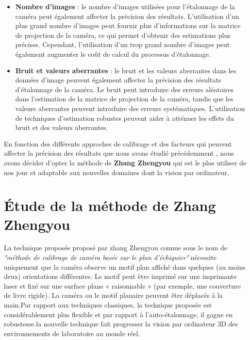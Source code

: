 \begin{itemize}
 	\item \textbf{Nombre d'images} :  le nombre d’images utilisées pour l’étalonnage de la caméra peut également affecter la précision des résultats. L’utilisation d’un plus grand nombre d’images peut fournir plus d’informations sur la matrice de projection de la caméra, ce qui permet d’obtenir des estimations plus précises. Cependant, l’utilisation d’un trop grand nombre d’images peut également augmenter le coût de calcul du processus d’étalonnage. \\
 	
 	\item \textbf{Bruit et valeurs aberrantes} :  le bruit et les valeurs aberrantes dans les données d’image peuvent également affecter la précision des résultats d’étalonnage de la caméra. Le bruit peut introduire des erreurs aléatoires dans l’estimation de la matrice de projection de la caméra, tandis que les valeurs aberrantes peuvent introduire des erreurs systématiques. L’utilisation de techniques d’estimation robustes peuvent aider à atténuer les effets du bruit et des valeurs aberrantes.
 \end{itemize}
 
 
 En fonction des différents approches de calibrage et des facteurs qui peuvent affecter la précision des résultats que nous avons étudié précédemment , nous avons décider d'opter la méthode de \textbf{Zhang Zhengyou} qui est le plus utiliser de nos jour et adaptable aux nouvelles domaines dont la vision par ordinateur.
 
 \section{ Étude de la méthode de Zhang Zhengyou}
 
  
 La technique proposée proposé par zhang Zhengyou  \cite{zhengyou_zhang_flexible_1999} connue sous le nom de \textit{"méthode de calibrage de caméra basée sur le plan d'échiquier"} nécessite uniquement que la caméra observe un motif plan affiché dans quelques (au moins deux) orientations  différentes. Le motif peut être imprimé sur une imprimante laser et fixé  sur une surface plane « raisonnable » (par exemple, une couverture de livre rigide). La caméra ou le motif planaire peuvent être déplacés à la main.Par rapport aux techniques classiques, la technique proposée est considérablement plus flexible et par rapport à  l’auto-étalonnage, il gagne en robustesse.la nouvelle technique fait progresser la vision par ordinateur 3D des environnements de laboratoire au monde réel.
 
